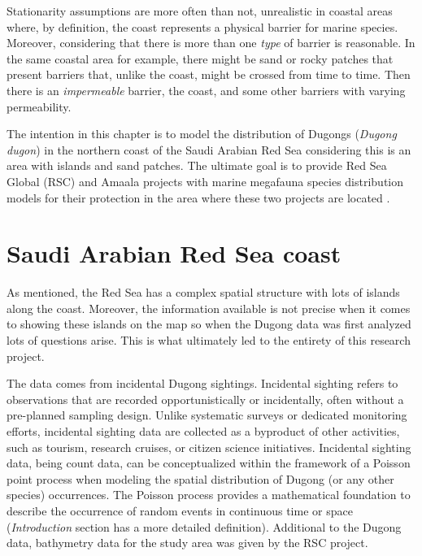\documentclass[
]{book}
\begin{document}
Stationarity assumptions are more often than not, unrealistic in coastal areas where, by definition, the coast represents a physical barrier for marine species. Moreover, considering that there is more than one \emph{type} of barrier is reasonable. In the same coastal area for example, there might be sand or rocky patches that present barriers that, unlike the coast, might be crossed from time to time. Then there is an \emph{impermeable} barrier, the coast, and some other barriers with varying permeability.

The intention in this chapter is to model the distribution of Dugongs (\emph{Dugong dugon}) in the northern coast of the Saudi Arabian Red Sea considering this is an area with islands and sand patches. The ultimate goal is to provide Red Sea Global (RSC) and Amaala projects with marine megafauna species distribution models for their protection in the area where these two projects are located \citep{public_investment_fund_red_2018, public_investment_fund_amaala_2018}.

\hypertarget{saudi-arabian-red-sea-coast}{%
\section{Saudi Arabian Red Sea coast}\label{saudi-arabian-red-sea-coast}}

As mentioned, the Red Sea has a complex spatial structure with lots of islands along the coast. Moreover, the information available is not precise when it comes to showing these islands on the map so when the Dugong data was first analyzed lots of questions arise. This is what ultimately led to the entirety of this research project.

The data comes from incidental Dugong sightings. Incidental sighting refers to observations that are recorded opportunistically or incidentally, often without a pre-planned sampling design. Unlike systematic surveys or dedicated monitoring efforts, incidental sighting data are collected as a byproduct of other activities, such as tourism, research cruises, or citizen science initiatives. Incidental sighting data, being count data, can be conceptualized within the framework of a Poisson point process when modeling the spatial distribution of Dugong (or any other species) occurrences. The Poisson process provides a mathematical foundation to describe the occurrence of random events in continuous time or space (\emph{Introduction} section has a more detailed definition). Additional to the Dugong data, bathymetry data for the study area was given by the RSC project.
\end{document}
